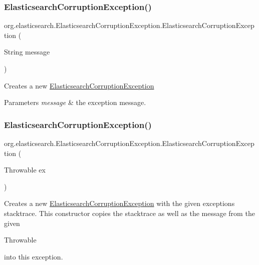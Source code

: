 \subsubsection{\texorpdfstring{Elasticsearch\+Corruption\+Exception()}{ElasticsearchCorruptionException()}\hspace{0.1cm}{\footnotesize\ttfamily [1/2]}}
{\footnotesize\ttfamily org.\+elasticsearch.\+Elasticsearch\+Corruption\+Exception.\+Elasticsearch\+Corruption\+Exception (\begin{DoxyParamCaption}\item[{String}]{message }\end{DoxyParamCaption})}

Creates a new \hyperlink{classorg_1_1elasticsearch_1_1_elasticsearch_corruption_exception}{Elasticsearch\+Corruption\+Exception} 
\begin{DoxyParams}{Parameters}
{\em message} & the exception message. \\
\hline
\end{DoxyParams}
\hypertarget{classorg_1_1elasticsearch_1_1_elasticsearch_corruption_exception_ab056deb66e8505b3b4d67e837af7c5bf}{}\label{classorg_1_1elasticsearch_1_1_elasticsearch_corruption_exception_ab056deb66e8505b3b4d67e837af7c5bf} 
\subsubsection{\texorpdfstring{Elasticsearch\+Corruption\+Exception()}{ElasticsearchCorruptionException()}\hspace{0.1cm}{\footnotesize\ttfamily [2/2]}}
{\footnotesize\ttfamily org.\+elasticsearch.\+Elasticsearch\+Corruption\+Exception.\+Elasticsearch\+Corruption\+Exception (\begin{DoxyParamCaption}\item[{Throwable}]{ex }\end{DoxyParamCaption})}

Creates a new \hyperlink{classorg_1_1elasticsearch_1_1_elasticsearch_corruption_exception}{Elasticsearch\+Corruption\+Exception} with the given exceptions stacktrace. This constructor copies the stacktrace as well as the message from the given 
\begin{DoxyCode}
Throwable 
\end{DoxyCode}
 into this exception.


